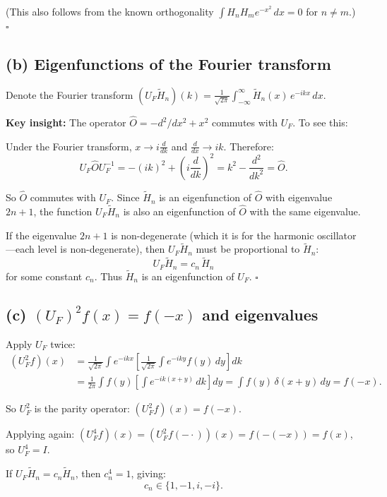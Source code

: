 \documentclass[12pt]{article}
\begin{document}
(This also follows from the known orthogonality $\int H_n H_m e^{-x^2}\,dx = 0$ for $n \neq m$.) \hfill $\square$

\subsection*{(b) Eigenfunctions of the Fourier transform}

Denote the Fourier transform $(U_F \tilde{H}_n)(k) = \frac{1}{\sqrt{2\pi}}\int_{-\infty}^{\infty} \tilde{H}_n(x)\,e^{-ikx}\,dx$.

\textbf{Key insight:} The operator $\hat{O} = -d^2/dx^2 + x^2$ commutes with $U_F$. To see this:

Under the Fourier transform, $x \to i\frac{d}{dk}$ and $\frac{d}{dx} \to ik$. Therefore:
\[
U_F \hat{O} U_F^{-1} = -(ik)^2 + \left(i\frac{d}{dk}\right)^2 = k^2 - \frac{d^2}{dk^2} = \hat{O}.
\]

So $\hat{O}$ commutes with $U_F$. Since $\tilde{H}_n$ is an eigenfunction of $\hat{O}$ with eigenvalue $2n+1$, the function $U_F\tilde{H}_n$ is also an eigenfunction of $\hat{O}$ with the same eigenvalue.

If the eigenvalue $2n+1$ is non-degenerate (which it is for the harmonic oscillator---each level is non-degenerate), then $U_F\tilde{H}_n$ must be proportional to $\tilde{H}_n$:
\[
U_F\tilde{H}_n = c_n\,\tilde{H}_n
\]
for some constant $c_n$. Thus $\tilde{H}_n$ is an eigenfunction of $U_F$. \hfill $\square$

\subsection*{(c) $(U_F)^2 f(x) = f(-x)$ and eigenvalues}

Apply $U_F$ twice:
\begin{align}
(U_F^2 f)(x) &= \frac{1}{\sqrt{2\pi}}\int e^{-ikx}\left[\frac{1}{\sqrt{2\pi}}\int e^{-iky}f(y)\,dy\right]dk \\
&= \frac{1}{2\pi}\int f(y)\left[\int e^{-ik(x+y)}\,dk\right]dy = \int f(y)\,\delta(x+y)\,dy = f(-x).
\end{align}

So $U_F^2$ is the parity operator: $(U_F^2 f)(x) = f(-x)$.

Applying again: $(U_F^4 f)(x) = (U_F^2 f(-\cdot))(x) = f(-(-x)) = f(x)$, so $U_F^4 = I$.

If $U_F \tilde{H}_n = c_n \tilde{H}_n$, then $c_n^4 = 1$, giving:
\[
\boxed{c_n \in \{1, -1, i, -i\}}.
\]
\end{document}
